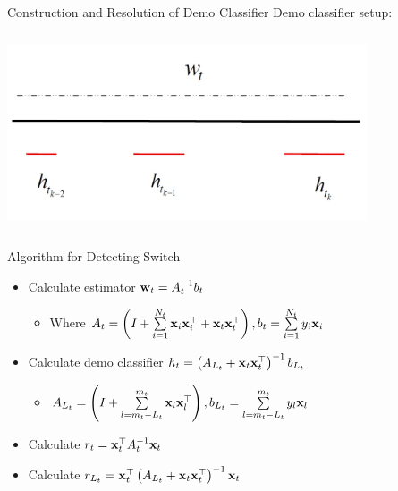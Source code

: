 \documentclass{beamer}
\begin{document}
\begin{frame}{Construction and Resolution of Demo  Classifier}
Demo classifier setup:
\begin{center}
\includegraphics[height=2.3in,width=4.2in]{classifier3.jpg}
\end{center}
\end{frame}


\begin{frame}{Algorithm for Detecting Switch}

\begin{itemize}
\item Calculate estimator $\mathbf{w}_{t}=A_{t}^{-1}b_t$ \newline
\begin{itemize}
\item Where $A_t=\left(I+\sum\limits_{i=1}^{N_t}\mathbf{x}_{i} {\mathbf{x}}^{\top}_{i}+ \mathbf{x}_{t} {\mathbf{x}}^{\top}_{t}\right), b_t=\sum\limits_{i=1}^{N_t}y_i\mathbf{x}_{i}$\newline\newline
\end{itemize}
\item Calculate demo classifier $h_t=\left(A_{L_t}+\mathbf{x}_{t}{\mathbf{x}}^{\top}_{t}\right)^{-1}b_{L_t}$ \newline
\begin{itemize}
\item $A_{L_t}=\left(I+\sum\limits_{l=m_t-L_t}^{m_t}{\mathbf{x}_{l}{\mathbf{x}}^{\top}_{l}}\right), b_{L_t}=\sum\limits_{l=m_t-L_t}^{m_t}y_l\mathbf{x}_{l}$ \newline\newline
\end{itemize}
\item Calculate $r_t={\mathbf{x}}^{\top}_{t}A_{t}^{-1}\mathbf{x}_{t}$\newline
\item Calculate $r_{L_t}={\mathbf{x}}^{\top}_{t}\left(A_{L_t}+\mathbf{x}_{t}{\mathbf{x}}^{\top}_{t}\right)^{-1}\mathbf{x}_{t}$
\end{itemize}
\end{frame}
\end{document}
